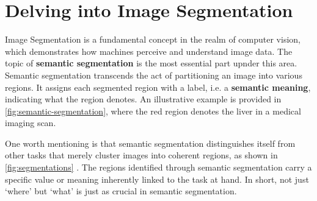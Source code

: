 \section{Delving into Image Segmentation}

Image Segmentation is a fundamental concept in the realm of computer vision, which demonstrates how machines perceive and understand image data. The topic of \textbf{semantic segmentation} is the most essential part upnder this area. Semantic segmentation transcends the act of partitioning an image into various regions. It assigns each segmented region with a label, i.e. a \textbf{semantic meaning}, indicating what the region denotes. An illustrative example is provided in \autoref{fig:semantic-segmentation}, where the red region denotes the liver in a medical imaging scan. 

One worth mentioning is that semantic segmentation distinguishes itself from other tasks that merely cluster images into coherent regions, as shown in \autoref{fig:segmentations} \cite{segmentation-mli}. The regions identified through semantic segmentation carry a specific value or meaning inherently linked to the task at hand. In short, not just `where' but `what' is just as crucial in semantic segmentation.

